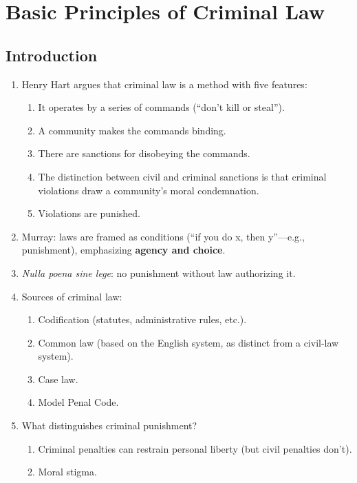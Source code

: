 \section{Basic Principles of Criminal Law}

\subsection{Introduction}

\begin{enumerate}
    \item Henry Hart argues that criminal law is a method with five features:
    \begin{enumerate}
        \item It operates by a series of commands (``don't kill or steal'').
        \item A community makes the commands binding.
        \item There are sanctions for disobeying the commands.
        \item The distinction between civil and criminal sanctions is that 
        criminal violations draw a community's moral condemnation.
        \item Violations are punished.
    \end{enumerate}
    \item Murray: laws are framed as conditions (``if you do x, then 
    y''---e.g., punishment), emphasizing \textbf{agency and choice}.
    \item \emph{Nulla poena sine lege}: no punishment without law authorizing 
    it. %
    \item Sources of criminal law:
    \begin{enumerate}
        \item Codification (statutes, administrative rules, etc.).
        \item Common law (based on the English system, as distinct from a 
        civil-law system).
        \item Case law.
        \item Model Penal Code.
    \end{enumerate}
    \item What distinguishes criminal punishment?
    \begin{enumerate}
        \item Criminal penalties can restrain personal liberty (but civil 
        penalties don't).
        \item Moral stigma.

\end{enumerate}
\end{enumerate}
